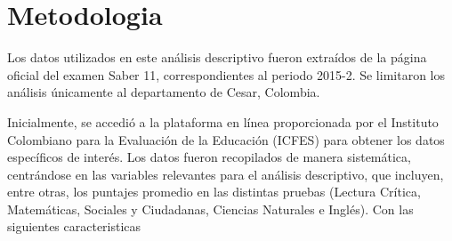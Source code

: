 \documentclass[12pt,a4paper,]{book}
\def\ifdoblecara{} %
\numberwithin{dummy}{section}
\theoremstyle{ocrenumbox}
\theoremstyle{ocrenumbox}
\theoremstyle{ocrenumbox}
\theoremstyle{ocrenumbox}
\theoremstyle{ocrenum}
\begin{document}
\fi

\ifdefined\ifdoblecara
\fancyhead{}{}
\fancyhead[LE,RO]{\scriptsize\rightmark}
\fancyfoot[LO,RE]{\scriptsize\slshape \leftmark}
\fancyfoot[C]{}
\fancyfoot[LE,RO]{\footnotesize\thepage}
\else
\fancyhead{}{}
\fancyhead[RO]{\scriptsize\rightmark}
\fancyfoot[LO]{\scriptsize\slshape \leftmark}
\fancyfoot[C]{}
\fancyfoot[RO]{\footnotesize\thepage}
\fi

\renewcommand{\headrulewidth}{0.4pt}
\renewcommand{\footrulewidth}{0.4pt}

\hypertarget{metodologia}{%
\chapter{Metodologia}\label{metodologia}}

Los datos utilizados en este análisis descriptivo fueron extraídos de la
página oficial del examen Saber 11, correspondientes al periodo 2015-2.
Se limitaron los análisis únicamente al departamento de Cesar, Colombia.

Inicialmente, se accedió a la plataforma en línea proporcionada por el
Instituto Colombiano para la Evaluación de la Educación (ICFES) para
obtener los datos específicos de interés. Los datos fueron recopilados
de manera sistemática, centrándose en las variables relevantes para el
análisis descriptivo, que incluyen, entre otras, los puntajes promedio
en las distintas pruebas (Lectura Crítica, Matemáticas, Sociales y
Ciudadanas, Ciencias Naturales e Inglés). Con las siguientes
caracteristicas
\end{document}
